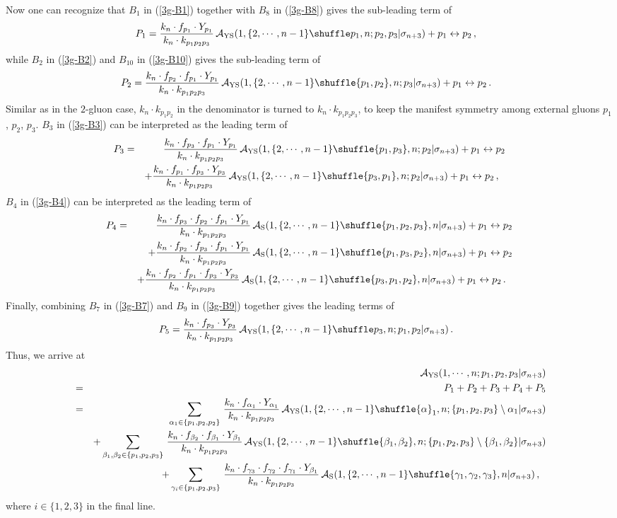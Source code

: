 \documentclass[11pt,a4paper]{article}
\newcommand{\bea}{\begin{eqnarray}}
\newcommand{\eea}{\end{eqnarray}}
\newcommand{\nn}{\nonumber \\}
\def\eref#1{(\ref{#1})}
\def\a{{\alpha}}
\def\b{{\beta}}
\begin{document}
Now one can recognize that $B_1$ in \eref{3g-B1} together with $B_8$ in \eref{3g-B8} gives the sub-leading term of
%
\bea
P_1={k_n\cdot f_{p_1}\cdot Y_{p_1}\over k_n\cdot k_{p_1p_2p_3}}\,{\cal A}_{\rm YS}(1,\{2,\cdots,n-1\}\shuffle p_1,n;p_2,p_3|\sigma_{n+3})+p_1\leftrightarrow p_2\,,~~\label{3g-P1}
\eea
%
while $B_2$ in \eref{3g-B2} and $B_{10}$ in \eref{3g-B10} gives the sub-leading term of
%
\bea
P_2={k_n\cdot f_{p_2}\cdot f_{p_1}\cdot Y_{p_1}\over k_n\cdot k_{p_1p_2p_3}}\,{\cal A}_{\rm YS}(1,\{2,\cdots,n-1\}\shuffle \{p_1,p_2\},n;p_3|\sigma_{n+3})+p_1\leftrightarrow p_2\,.~~\label{3g-P2}
\eea
%
Similar as in the $2$-gluon case, $k_n\cdot k_{p_1p_2}$ in the denominator is turned to $k_{n}\cdot k_{p_1p_2p_3}$, to keep the manifest symmetry among external gluons $p_1$, $p_2$, $p_3$. $B_3$ in \eref{3g-B3} can be interpreted as the leading term of
%
\bea
P_3&=&{k_n\cdot f_{p_3}\cdot f_{p_1}\cdot Y_{p_1}\over k_n\cdot k_{p_1p_2p_3}}\,{\cal A}_{\rm YS}(1,\{2,\cdots,n-1\}\shuffle \{p_1,p_3\},n;p_2|\sigma_{n+3})+p_1\leftrightarrow p_2\nn
& &+{k_n\cdot f_{p_1}\cdot f_{p_3}\cdot Y_{p_3}\over k_n\cdot k_{p_1p_2p_3}}\,{\cal A}_{\rm YS}(1,\{2,\cdots,n-1\}\shuffle \{p_3,p_1\},n;p_2|\sigma_{n+3})+p_1\leftrightarrow p_2\,,~~\label{3g-B3}
\eea
%
$B_4$ in \eref{3g-B4} can be interpreted as the leading term of
%
\bea
P_4&=&{k_n\cdot f_{p_3}\cdot f_{p_2}\cdot f_{p_1}\cdot Y_{p_1}\over k_n\cdot k_{p_1p_2p_3}}\,{\cal A}_{\rm S}(1,\{2,\cdots,n-1\}\shuffle \{p_1,p_2,p_3\},n|\sigma_{n+3})+p_1\leftrightarrow p_2\nn
& &+{k_n\cdot f_{p_2}\cdot f_{p_3}\cdot f_{p_1}\cdot Y_{p_1}\over k_n\cdot k_{p_1p_2p_3}}\,{\cal A}_{\rm S}(1,\{2,\cdots,n-1\}\shuffle \{p_1,p_3,p_2\},n|\sigma_{n+3})+p_1\leftrightarrow p_2\nn
& &+{k_n\cdot f_{p_2}\cdot f_{p_1}\cdot f_{p_3}\cdot Y_{p_3}\over k_n\cdot k_{p_1p_2p_3}}\,{\cal A}_{\rm S}(1,\{2,\cdots,n-1\}\shuffle \{p_3,p_1,p_2\},n|\sigma_{n+3})+p_1\leftrightarrow p_2\,.~~\label{3g-P4}
\eea
%
Finally, combining $B_7$ in \eref{3g-B7} and $B_9$ in \eref{3g-B9} together gives the leading terms of
%
\bea
P_5={k_n\cdot f_{p_3}\cdot Y_{p_3}\over k_n\cdot k_{p_1p_2p_3}}\,{\cal A}_{\rm YS}(1,\{2,\cdots,n-1\}\shuffle p_3,n;p_1,p_2|\sigma_{n+3})\,.~~\label{3g-P5}
\eea
%
Thus, we arrive at
%
\bea
& &{\cal A}_{\rm YS}(1,\cdots,n;p_1,p_2,p_3|\sigma_{n+3})\nn
&=&P_1+P_2+P_3+P_4+P_5\nn
&=&\sum_{\a_1\in\{p_1,p_2,p_2\}}\,{k_n\cdot f_{\a_1}\cdot Y_{\a_1}\over k_n\cdot k_{p_1p_2p_3}}\,{\cal A}_{\rm YS}(1,\{2,\cdots,n-1\}\shuffle \a_1,n;\{p_1,p_2,p_3\}\setminus\a_1|\sigma_{n+3})\nn
& &+\sum_{\b_1,\b_2\in\{p_1,p_2,p_3\}}\,{k_n\cdot f_{\b_2}\cdot f_{\b_1}\cdot Y_{\b_1}\over k_n\cdot k_{p_1p_2p_3}}\,{\cal A}_{\rm YS}(1,\{2,\cdots,n-1\}\shuffle \{\b_1,\b_2\},n;\{p_1,p_2,p_3\}\setminus\{\b_1,\b_2\}|\sigma_{n+3})\nn
& &+\sum_{\gamma_i\in\{p_1,p_2,p_3\}}\,{k_n\cdot f_{\gamma_3}\cdot f_{\gamma_2}\cdot f_{\gamma_1}\cdot Y_{\b_1}\over k_n\cdot k_{p_1p_2p_3}}\,{\cal A}_{\rm S}(1,\{2,\cdots,n-1\}\shuffle \{\gamma_1,\gamma_2,\gamma_3\},n|\sigma_{n+3})\,,~~\label{expan-3g-gi}
\eea
%
where $i\in\{1,2,3\}$ in the final line.
\end{document}
